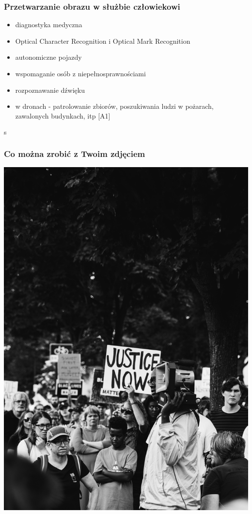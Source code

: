 \documentclass{beamer}
\begin{document}
            \begin{frame}
                \frametitle{Przetwarzanie obrazu w służbie człowiekowi}
                \begin{itemize}
                    \item diagnostyka medyczna
                    \item Optical Character Recognition i Optical Mark Recognition
                    \item autonomiczne pojazdy
                    \item wspomaganie osób z niepełnosprawnościami
                    \item rozpoznawanie dźwięku
                    \item w dronach - patrolowanie zbiorów, poszukiwania ludzi w pożarach, zawalonych budynkach, itp [A1]
                \end{itemize}
            \end{frame}

            \begin{frame}
                \begin{center}s
                    \frametitle{Co można zrobić z Twoim zdjęciem}
                    \includegraphics[height=0.8\textheight]{pictures/protest.jpg}
                \end{center}
            \end{frame}
\end{document}
